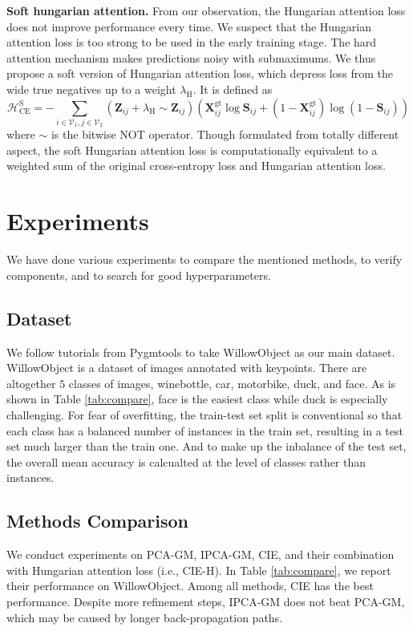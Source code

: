 \documentclass[a4paper]{article}
\begin{document}
\textbf{Soft hungarian attention.} From our observation, the Hungarian attention loss does not improve performance every time. We suspect that the Hungarian attention loss is too strong to be used in the early training stage. The hard attention mechanism makes predictions noisy with submaximums. We thus propose a soft version of Hungarian attention loss, which depress loss from the wide true negatives up to a weight $\lambda_{\mathrm{H}}$. It is defined as
$$
\mathcal{H}_{\mathrm{CE}}^\mathrm{S} = -\sum_{i\in \mathcal{V}_1, j\in \mathcal{V}_2 } \left(\mathbf{Z}_{ij} + \lambda_{\mathrm{H}} \sim \mathbf{Z}_{ij}\right) \left(\mathbf{X}_{ij}^{\mathrm{gt}} \log\mathbf{S}_{ij} + \left(1-\mathbf{X}_{ij}^{\mathrm{gt}}\right) \log \left(1- \mathbf{S}_{ij}\right) \right)
$$
where $\sim$ is the bitwise NOT operator. Though formulated from totally different aspect, the soft Hungarian attention loss is computationally equivalent to a weighted sum of the original cross-entropy loss and Hungarian attention loss.

\section{Experiments}
We have done various experiments to compare the mentioned methods, to verify components, and to search for good hyperparameters. 

\subsection{Dataset}
We follow tutorials from Pygmtools \cite{pygmtools} to take WillowObject \cite{willow} as our main dataset. WillowObject is a dataset of images annotated with keypoints. There are altogether $5$ classes of images, winebottle, car, motorbike, duck, and face. As is shown in Table \ref{tab:compare}, face is the easiest class while duck is especially challenging. For fear of overfitting, the train-test set split is conventional so that each class has a balanced number of instances in the train set, resulting in a test set much larger than the train one. And to make up the inbalance of the test set, the overall mean accuracy is calcualted at the level of classes rather than instances.

\subsection{Methods Comparison}
We conduct experiments on PCA-GM, IPCA-GM, CIE, and their combination with Hungarian attention loss (i.e., CIE-H). In Table \ref{tab:compare}, we report their performance on WillowObject. Among all methods, CIE has the best performance. Despite more refinement steps, IPCA-GM does not beat PCA-GM, which may be caused by longer back-propagation paths.
\end{document}
